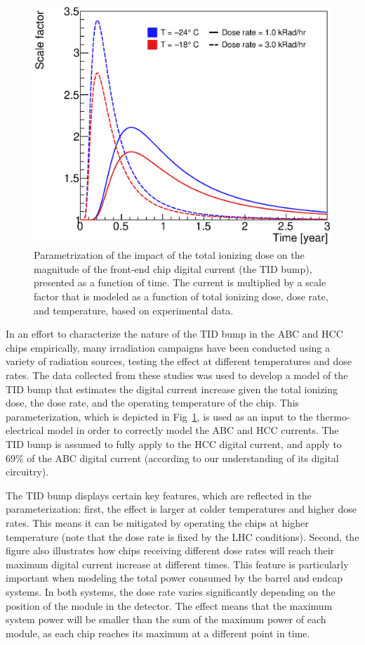 \begin{figure}[ht]
\centering
\includegraphics[width=0.45\linewidth]{figures/AbcTidBumpVersionRatesAndTemps_Nominal.eps}
\caption{Parametrization of the impact of the total ionizing dose
on the magnitude of the front-end chip digital current (the TID bump), presented as a function of time.
The current is multiplied by a scale factor that is modeled as a function of total ionizing dose,
dose rate, and temperature, based on experimental data.
}
\label{tid_bump}
\end{figure}

In an effort to characterize the nature of the TID bump in the ABC and HCC chips empirically,
many irradiation campaigns have been conducted using a variety of radiation sources, testing
the effect at different temperatures and dose rates.
The data collected from these studies was used to develop a model of the TID bump
that estimates the digital current increase given the total ionizing dose, the dose rate,
and the operating temperature of the chip. This parameterization, which is depicted in
Fig~\ref{tid_bump}, is used as an input to the thermo-electrical model in order to correctly model the
ABC and HCC currents. The TID bump is assumed to fully apply to the HCC digital current, and apply to
69\% of the ABC digital current (according to our understanding of its digital circuitry).

The TID bump displays certain key features, which are reflected in the parameterization:
first, the effect is larger at colder temperatures and higher dose rates. This means it can be
mitigated by operating the chips at higher temperature (note that the dose rate is fixed by the LHC conditions).
Second, the figure also illustrates how chips receiving different dose rates will reach their maximum
digital current increase at different times. This feature is particularly important when modeling the
total power consumed by the barrel and endcap systems. In both systems, the dose rate varies significantly
depending on the position of the module in the detector. The effect means that the maximum system
power will be smaller than the sum of the maximum power of each module, as each chip reaches
its maximum at a different point in time.

